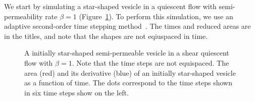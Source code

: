 \documentclass[aps,prl,showpacs]{revtex4}
\begin{document}
We start by simulating a star-shaped vesicle in a quiescent flow with
semi-permeability rate $\beta=1$ (Figure~\ref{fig:starShape}). To
perform this simulation, we use an adaptive second-order time stepping
method~\cite{qua-bir2016}. The times and reduced areas are in the
titles, and note that the shapes are not eqiuspaced in time.
\begin{figure}[htp]
  \begin{minipage}{0.55\textwidth}
    
    
    
    
    
    
  \end{minipage}
  \hfill
  \begin{minipage}{0.4\textwidth}
  
  \end{minipage}
  \caption{\label{fig:starShape} A initially star-shaped semi-permeable
  vesicle in a shear quiescent flow with $\beta=1$. Note that the time
  steps are not equispaced. The area (red) and its derivative (blue) of
  an initially star-shaped vesicle as a function of time. The dots
  correspond to the time steps shown in six time steps
  show on the left.}
\end{figure}
\end{document}

